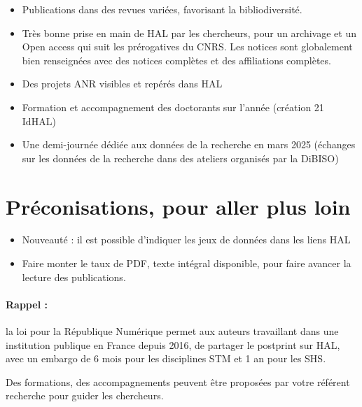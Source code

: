 \documentclass[french, 11pt]{assets/biso}
\begin{document}
\begin{itemize}
  \item Publications dans des revues variées, favorisant la bibliodiversité.
  \item Très bonne prise en main de HAL par les chercheurs, pour un archivage et un Open access qui suit les prérogatives du CNRS. Les notices sont globalement bien renseignées avec des notices complètes et des affiliations complètes.
  \item Des projets ANR visibles et repérés dans HAL
  \item Formation et accompagnement des doctorants sur l’année (création 21 IdHAL)
  \item Une demi-journée dédiée aux données de la recherche en mars 2025 (échanges sur les données de la recherche dans des ateliers organisés par la DiBISO)
\end{itemize}


\section{Préconisations, pour aller plus loin}

\begin{itemize}
  \item Nouveauté : il est possible d’indiquer les jeux de données dans les liens HAL 
  \item Faire monter le taux de PDF, texte intégral disponible, pour faire avancer la lecture des publications.
\end{itemize}

\vfill

\paragraph{Rappel :} la loi pour la République Numérique permet aux auteurs travaillant dans une institution publique en France depuis 2016, de partager le postprint sur HAL, avec un embargo de 6 mois pour les disciplines STM et 1 an pour les SHS.

Des formations, des accompagnements peuvent être proposées par votre référent recherche pour guider les chercheurs. 




\makelastpagereport
 
\end{document}
